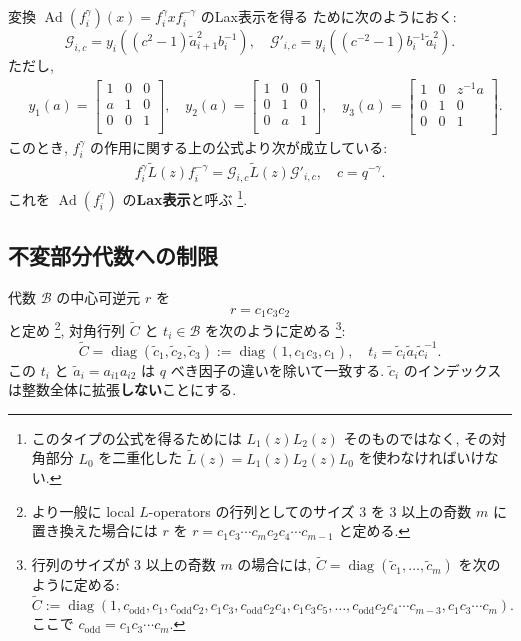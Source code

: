 \documentclass[12pt,twoside,dvipdfm]{msjproc}
\theoremstyle{definition} %
\theoremstyle{definition} %
\theoremstyle{definition} %
\numberwithin{theorem}{section}
\numberwithin{equation}{section}
\numberwithin{figure}{section}
\numberwithin{table}{section}
\newcommand\B{\mathcal{B}}
\newcommand\diag{\mathop{\mathrm{diag}}\nolimits}
\newcommand\tL{{\widetilde{L}}}
\newcommand\cG{{\mathcal{G}}}
\newcommand\Ad{\mathop{\mathrm{Ad}}\nolimits}
\newcommand\tC{{\widetilde{C}}}
\newcommand\ta{{\tilde{a}}}
\newcommand\tc{{\tilde{c}}}
\newcommand\co{c_{\mathrm{odd}}}
\begin{document}
変換 $\Ad(f_i^\gamma)(x)=f_i^\gamma x f_i^{-\gamma}$ のLax表示を得る
ために次のようにおく:
\begin{equation*}
 \cG_{i,c}  = y_i((c^{ 2}-1)\ta_{i+1}^2 b_i^{-1}), \quad
 \cG'_{i,c} = y_i((c^{-2}-1)b_i^{-1}\ta_i^2).
\end{equation*} 
ただし,
\begin{align*}
 &
 y_1(a) =
 \begin{bmatrix}
   1 & 0 & 0 \\
   a & 1 & 0 \\
   0 & 0 & 1 \\
 \end{bmatrix},
 \quad
 y_2(a) =
 \begin{bmatrix}
   1 & 0 & 0 \\
   0 & 1 & 0 \\
   0 & a & 1 \\
 \end{bmatrix},
 \quad
 y_3(a) =
 \begin{bmatrix}
   1 & 0 & z^{-1}a \\
   0 & 1 & 0 \\
   0 & 0 & 1 \\
 \end{bmatrix}.
\end{align*}
このとき, $f_i^\gamma$ の作用に関する上の公式より次が成立している:
\begin{align*}
  f_i^\gamma \tL(z) f_i^{-\gamma} = \cG_{i,c} \tL(z) \cG'_{i,c}, \quad
  c = q^{-\gamma}.
\end{align*}
これを $\Ad(f_i^\gamma)$ の{\bf Lax表示}と呼ぶ%
\footnote{このタイプの公式を得るためには $L_1(z)L_2(z)$ そのものではなく, 
その対角部分 $L_0$ を二重化した $\tL(z)=L_1(z)L_2(z)L_0$ を使わなければいけない.}.




\subsection{不変部分代数への制限}
\label{sec:fhat}

代数 $\B$ の中心可逆元 $r$ を
\begin{equation*}
 r = c_1 c_3 c_2
\end{equation*}
と定め%
\footnote{より一般に local $L$-operators の行列としてのサイズ $3$ 
を $3$ 以上の奇数 $m$ に置き換えた場合には $r$ を \(
 r = c_1 c_3 \cdots c_m c_2 c_4 \cdots c_{m-1}
\) と定める.}, %
対角行列 $\tC$ と $t_i\in\B$ を次のように定める%
\footnote{行列のサイズが $3$ 以上の奇数 $m$ の場合には,
$\tC=\diag(\tc_1,\ldots,\tc_m)$ を次のように定める: 
\[
 \tC
 := \diag
  (1, 
   \co,                      c_1, 
   \co c_2,                  c_1c_3, 
   \co c_2c_4,               c_1c_3c_5, 
   \ldots, 
   \co c_2c_4\cdots c_{m-3}, c_1c_3\cdots c_m).
\]
ここで $\co=c_1c_3\cdots c_m$.}:
\begin{equation*}
 \tC = \diag(\tc_1,\tc_2,\tc_3) := \diag(1, c_1 c_3, c_1), \quad
 t_i = \tc_i \ta_i \tc_i^{-1}.
\end{equation*}
この $t_i$ と $\ta_i=a_{i1}a_{i2}$ は $q$ べき因子の違いを除いて一致する.
$\tc_i$ のインデックスは整数全体に拡張{\bf しない}ことにする.
\end{document}
